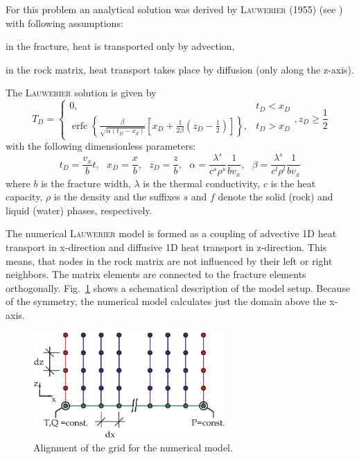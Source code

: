 For this problem an analytical solution was derived by \textsc{Lauwerier} (1955) (see \cite{Kol:97}) with following assumptions:
\begin{compactitem}
\item in the fracture, heat is transported only by advection,
\item in the rock matrix, heat transport takes place by diffusion (only along the z-axis).
\end{compactitem}
The \textsc{Lauwerier} solution is given by
%
\begin{equation}
T_D=\begin{cases}
0, & t_D < x_D \\
\operatorname{erfc}\left\{ \frac{\beta}{\sqrt{\alpha\left(t_D-x_d\right)}} \left[ x_D+\frac{1}{2\beta}\left( z_D-\frac{1}{2} \right) \right]\right\}, & t_D > x_D
\end{cases},   z_D \geq\frac{1}{2}
\label{lauwerier}
\end{equation}
%
with the following dimensionless parameters:
%
\begin{equation}
t_D=\frac{v_x}{b}t,\ \ \ x_D=\frac{x}{b},\ \ \ z_D=\frac{z}{b},\ \ \ \alpha =\frac{\lambda ^{s}}{c^{s}\rho ^{s}}\frac{1}{bv_x},\ \ \ \beta = \frac{\lambda^{s}}{c^{l}\rho^{l}}\frac{1}{bv_x}
\end{equation}
%
where $b$ is the fracture width, $\lambda$ is the thermal conductivity, $c$ is the heat capacity, $\rho$ is the density and the suffixes $s$ and $f$ denote the solid (rock) and liquid (water) phases, respectively.

The numerical \textsc{Lauwerier} model is formed as a coupling of advective 1D heat transport in x-direction and diffusive 1D heat transport in z-direction. This means, that nodes in the rock matrix are not influenced by their left or right neighbors. The matrix elements are connected to the fracture elements orthogonally. Fig.~\ref{fig-lauwerier-grid} shows a schematical description of the model setup. Because of the symmetry, the numerical model calculates just the domain above the x-axis. 

\begin{figure}[htbp!]
\centering
\includegraphics[width=0.65\textwidth]{PART_II/T/lauwerier-grid.eps}
\caption{\label{fig-lauwerier-grid}Alignment of the grid for the numerical model.}
\end{figure}

